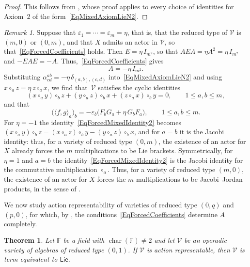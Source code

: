 \documentclass[reqno,a4paper]{amsart}
\theoremstyle{plain}
\newtheorem{theorem}[subsection]{Theorem}
\theoremstyle{definition}
\theoremstyle{remark}
\newtheorem{remark}[subsection]{Remark}
\numberwithin{equation}{section}
\newcommand{\F}{\mathbb{F}}
\newcommand{\V}{\mathcal{V}}
\DeclareMathOperator{\bchar}{char}
\newcommand{\Lie}{\ensuremath{\mathsf{Lie}}}
\begin{document}
\begin{proof}
This follows from , whose proof applies to every choice of identities for Axiom~2 of the form~\eqref{EqMixedAxiomLieN2}.
\end{proof}

\begin{remark}\label{RemarkPureTypes}
Suppose that $\varepsilon_1=\cdots=\varepsilon_m=\eta$, that is, that the reduced type of $\V$ is $(m,0)$ or $(0,m)$, and that $X$ admits an actor in $\V$, so that~\eqref{EqForcedCoefficients} holds. Then $E=\eta\,I_{m^2}$, so that $AEA=\eta A^2=\eta\,I_{m^2}$ and $-EAE=-A$. Thus,~\eqref{EqForcedCoefficients} gives
\[
A=-\eta\,I_{m^2}.
\]
Substituting $\alpha^{ab}_{cd}=-\eta\,\delta_{(a,b),(c,d)}$ into~\eqref{EqMixedAxiomLieN2} and using $x\circ_az=\eta\,z\circ_ax$, we find that~$\V$ satisfies the cyclic identities
\begin{equation}\label{EqForcedMixedIdentity2}
(x\circ_ay)\circ_bz+(y\circ_az)\circ_bx+(z\circ_ax)\circ_by=0,
\qquad
1\leq a,b\leq m,
\end{equation}
and that
\begin{equation}\label{EqBracketOnE}
\bigl(\langle f,g\rangle_a\bigr)_b=-\varepsilon_b\bigl(F_bG_a+\eta\,G_bF_a\bigr),
\qquad
1\leq a,b\leq m .
\end{equation}
For $\eta=-1$ the identity~\eqref{EqForcedMixedIdentity2} becomes $(x\circ_ay)\circ_bz=(x\circ_az)\circ_by-(y\circ_az)\circ_bx$, and for $a=b$ it is the Jacobi identity: thus, for a variety of reduced type $(0,m)$, the existence of an actor for $X$ already forces the $m$ multiplications to be Lie brackets. Symmetrically, for $\eta=1$ and $a=b$ the identity~\eqref{EqForcedMixedIdentity2} is the Jacobi identity for the commutative multiplication $\circ_a$. Thus, for a variety of reduced type $(m,0)$, the existence of an actor for $X$ forces the $m$ multiplications to be Jacobi--Jordan products, in the sense of . 
\end{remark}

We now study action representability of varieties of reduced type $(0,q)$ and $(p,0)$, for which, by , the conditions~\eqref{EqForcedCoefficients} determine $A$ completely.

\begin{theorem}\label{TheoremAntiCommOne}
Let $\F$ be a field with $\bchar(\F)\neq2$ and let $\V$ be an operadic variety of algebras of reduced type $(0,1)$. If $\V$ is action representable, then $\V$ is term equivalent to $\Lie$.
\end{theorem}
\end{document}
